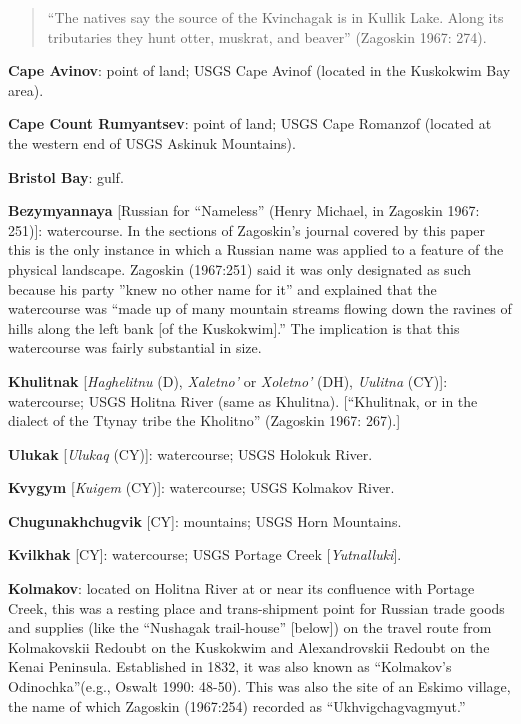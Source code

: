\begin{hang}
\begin{quote}
    “The natives say the source of the Kvinchagak is in Kullik Lake. Along its tributaries they hunt otter, muskrat, and beaver” (Zagoskin 1967: 274).

    \end{quote}





\textbf{Cape Avinov}: point of land; USGS Cape Avinof (located in the Kuskokwim Bay area).



\textbf{Cape Count Rumyantsev}: point of land; USGS Cape Romanzof (located at the western end of USGS Askinuk Mountains).



\textbf{Bristol Bay}: gulf.



\textbf{Bezymyannaya} [Russian for “Nameless” (Henry Michael, in Zagoskin 1967: 251)]: watercourse. In the sections of Zagoskin’s journal covered by this paper this is the only instance in which a Russian name was applied to a feature of the physical landscape. Zagoskin (1967:251) said it was only designated as such because his party ”knew no other name for it” and explained that the watercourse was “made up of many mountain streams flowing down the ravines of hills along the left bank [of the Kuskokwim].” The implication is that this watercourse was fairly substantial in size.



\textbf{Khulitnak} [\textit{Haghelitnu} (D), \textit{Xaletno’} or \textit{Xoletno’} (DH), \textit{Uulitna} (CY)]: watercourse; USGS Holitna River (same as Khulitna). [“Khulitnak, or in the dialect of the Ttynay tribe the Kholitno” (Zagoskin 1967: 267).]



\textbf{Ulukak} [\textit{Ulukaq} (CY)]: watercourse; USGS Holokuk River.



\textbf{Kvygym} [\textit{Kuigem} (CY)]: watercourse; USGS Kolmakov River.



\textbf{Chugunakhchugvik} [CY]: mountains; USGS Horn Mountains.



\textbf{Kvilkhak} [CY]: watercourse; USGS Portage Creek [\textit{Yutnalluki}].



\textbf{Kolmakov}: located on Holitna River at or near its confluence with Portage Creek, this was a resting place and trans-shipment point for Russian trade goods and supplies (like the “Nushagak trail-house” [below]) on the travel route from Kolmakovskii Redoubt on the Kuskokwim and Alexandrovskii Redoubt on the Kenai Peninsula. Established in 1832, it was also known as “Kolmakov’s Odinochka”(e.g., Oswalt 1990: 48-50). This was also the site of an Eskimo village, the name of which Zagoskin (1967:254) recorded as “Ukhvigchagvagmyut.”




\end{hang}
